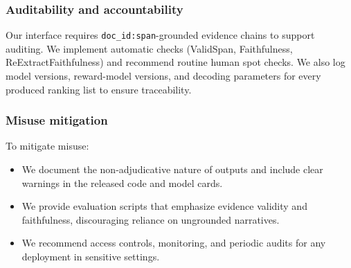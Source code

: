 \documentclass{article}
\begin{document}
\subsubsection{Auditability and accountability}

Our interface requires \texttt{doc\_id:span}-grounded evidence chains to support auditing.
We implement automatic checks (ValidSpan, Faithfulness, ReExtractFaithfulness) and recommend routine human spot checks.
We also log model versions, reward-model versions, and decoding parameters for every produced ranking list to ensure traceability.

\subsubsection{Misuse mitigation}

To mitigate misuse:
\begin{itemize}
    \item We document the non-adjudicative nature of outputs and include clear warnings in the released code and model cards.
    \item We provide evaluation scripts that emphasize evidence validity and faithfulness, discouraging reliance on ungrounded narratives.
    \item We recommend access controls, monitoring, and periodic audits for any deployment in sensitive settings.
\end{itemize}

\FloatBarrier
\clearpage

\end{document}
